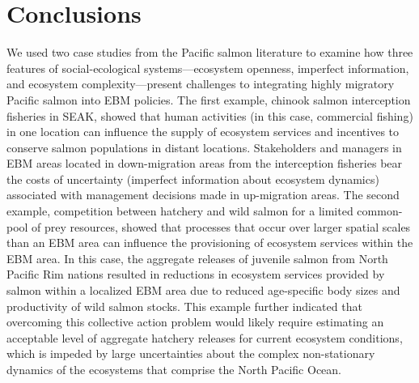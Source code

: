 \section{Conclusions}

We used two case studies from the Pacific salmon literature to examine how three
features of social-ecological systems---ecosystem openness, imperfect
information, and ecosystem complexity---present challenges to integrating
highly migratory Pacific salmon into EBM policies. The first example, chinook
salmon interception fisheries in SEAK, showed that human activities (in this
case, commercial fishing) in one location can influence the supply of ecosystem
services and incentives to conserve salmon populations in distant locations.
Stakeholders and managers in EBM areas located in down-migration areas from the
interception fisheries bear the costs of uncertainty (imperfect information
about ecosystem dynamics) associated with management decisions made in
up-migration areas. The second example, competition between hatchery and
wild salmon for a limited common-pool of prey resources, showed that processes
that occur over larger spatial scales than an EBM area can influence the
provisioning of ecosystem services within the EBM area. In this case, the
aggregate releases of juvenile salmon from North Pacific Rim nations resulted in
reductions in ecosystem services provided by salmon within a localized EBM area
due to reduced age-specific body sizes and productivity of wild salmon stocks.
This example further indicated that overcoming this collective action problem
would likely require estimating an acceptable level of aggregate hatchery
releases for current ecosystem conditions, which is impeded by large
uncertainties about the complex non-stationary dynamics of the ecosystems that
comprise the North Pacific Ocean.

